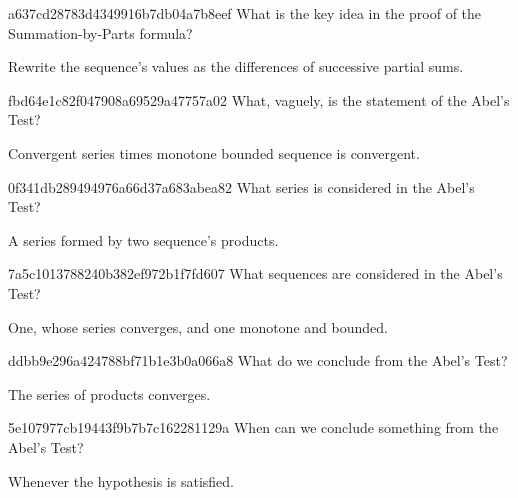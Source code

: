 \begin{note}{a637cd28783d4349916b7db04a7b8eef}
    What is the key idea in the proof of the Summation-by-Parts formula?

    \begin{cloze}{1}
        Rewrite the sequence's values as the differences of successive partial sums.
    \end{cloze}
\end{note}

\begin{note}{fbd64e1c82f047908a69529a47757a02}
    What, vaguely, is the statement of the Abel's Test?

    \begin{cloze}{1}
        Convergent series times monotone bounded sequence is convergent.
    \end{cloze}
\end{note}

\begin{note}{0f341db289494976a66d37a683abea82}
    What series is considered in the Abel's Test?

    \begin{cloze}{1}
        A series formed by two sequence's products.
    \end{cloze}
\end{note}

\begin{note}{7a5c1013788240b382ef972b1f7fd607}
    What sequences are considered in the Abel's Test?

    \begin{cloze}{1}
        One, whose series converges, and one monotone and bounded.
    \end{cloze}
\end{note}

\begin{note}{ddbb9e296a424788bf71b1e3b0a066a8}
    What do we conclude from the Abel's Test?

    \begin{cloze}{1}
        The series of products converges.
    \end{cloze}
\end{note}

\begin{note}{5e107977cb19443f9b7b7c162281129a}
    When can we conclude something from the Abel's Test?

    \begin{cloze}{1}
        Whenever the hypothesis is satisfied.
    \end{cloze}
\end{note}

